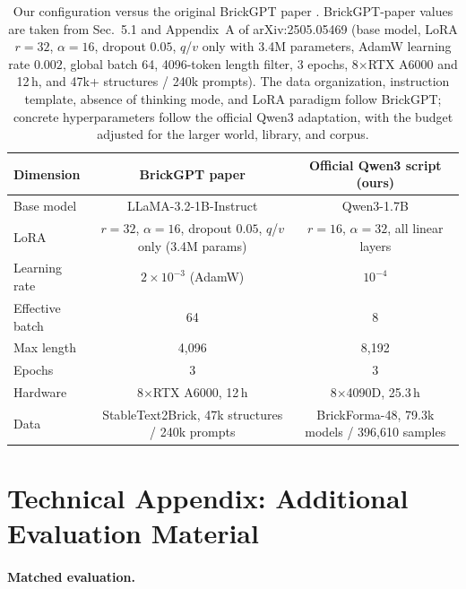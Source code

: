\documentclass[letterpaper]{article} %
\begin{document}
\begin{table}[!htbp]
\centering
\small
\setlength{\tabcolsep}{5pt}
\begin{tabular}{lcc}
\toprule
Dimension & BrickGPT paper & Official Qwen3 script (ours) \\
\midrule
Base model & LLaMA-3.2-1B-Instruct & Qwen3-1.7B \\
LoRA & $r=32$, $\alpha=16$, dropout $0.05$, $q$/$v$ only (3.4M params) & $r=16$, $\alpha=32$, all linear layers \\
Learning rate & $2{\times}10^{-3}$ (AdamW) & $10^{-4}$ \\
Effective batch & 64 & 8 \\
Max length & 4,096 & 8,192 \\
Epochs & 3 & 3 \\
Hardware & 8$\times$RTX A6000, 12\,h & 8$\times$4090D, 25.3\,h \\
Data & StableText2Brick, 47k structures / 240k prompts & BrickForma-48, 79.3k models / 396,610 samples \\
\bottomrule
\end{tabular}
\caption{Our configuration versus the original BrickGPT paper \cite{brickgpt}. BrickGPT-paper values are taken from Sec.~5.1 and Appendix~A of arXiv:2505.05469 (base model, LoRA $r{=}32$, $\alpha{=}16$, dropout $0.05$, $q$/$v$ only with 3.4M parameters, AdamW learning rate $0.002$, global batch 64, 4096-token length filter, 3 epochs, 8$\times$RTX A6000 and 12\,h, and 47k+ structures / 240k prompts). The data organization, instruction template, absence of thinking mode, and LoRA paradigm follow BrickGPT; concrete hyperparameters follow the official Qwen3 adaptation, with the budget adjusted for the larger world, library, and corpus.}
\label{tab:brickgpt-recipe}
\end{table}


\section{Technical Appendix: Additional Evaluation Material}
\label{app:eval}

\paragraph{Matched evaluation.}
\end{document}
